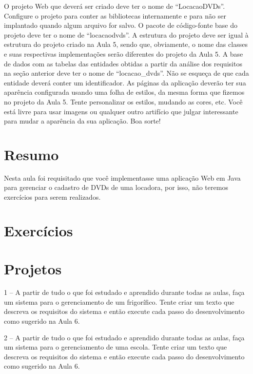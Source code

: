 O projeto Web que deverá ser criado deve ter o nome de “LocacaoDVDs”. Configure o projeto para conter as bibliotecas internamente e para não ser implantado quando algum arquivo for salvo. O pacote de código-fonte base do projeto deve ter o nome de “locacaodvds”. A estrutura do projeto deve ser igual à estrutura do projeto criado na Aula 5, sendo que, obviamente, o nome das classes e suas respectivas implementações serão diferentes do projeto da Aula 5. A base de dados com as tabelas das entidades obtidas a partir da análise dos requisitos na seção anterior deve ter o nome de “locacao\_dvds”. Não se esqueça de que cada entidade deverá conter um identificador. As páginas da aplicação deverão ter sua aparência configurada usando uma folha de estilos, da mesma forma que fizemos no projeto da Aula 5. Tente personalizar os estilos, mudando as cores, etc. Você está livre para usar imagens ou qualquer outro artifício que julgar interessante para mudar a aparência da sua aplicação. Boa sorte!


\section{Resumo}

Nesta aula foi requisitado que você implementasse uma aplicação Web em Java para gerenciar o cadastro de DVDs de uma locadora, por isso, não teremos exercícios para serem realizados. 


\section{Exercícios}

\section{Projetos}

1 – A partir de tudo o que foi estudado e aprendido durante todas as aulas, faça um sistema para o gerenciamento de um frigorífico. Tente criar um texto que descreva os requisitos do sistema e então execute cada passo do desenvolvimento como sugerido na Aula 6.

2 – A partir de tudo o que foi estudado e aprendido durante todas as aulas, faça um sistema para o gerenciamento de uma escola. Tente criar um texto que descreva os requisitos do sistema e então execute cada passo do desenvolvimento como sugerido na Aula 6.
